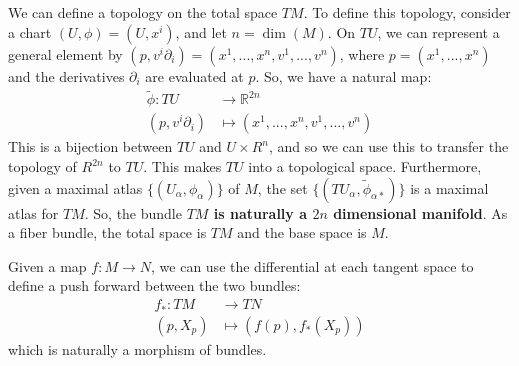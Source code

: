 \documentclass[11pt, oneside]{article}   	%
\theoremstyle{definition}
\begin{document}
We can define a topology on the total space $TM$. To define this topology, consider a chart $(U, \phi) = (U, x^i)$, and let $n = 
\dim(M)$. On $TU$, we can represent a general element by $(p, v^i\partial_i) = (x^1, ..., x^n, v^1, ..., v^n)$, where $p = 
(x^1, ..., x^n)$ and the derivatives $\partial_i$ are evaluated at $p$. So, we have a natural map:
\begin{align}
	\tilde \phi : TU &\rightarrow \mathbb R^{2n} \\
	(p, v^i\partial_i) &\mapsto (x^1, ..., x^n, v^1, ..., v^n)
\end{align}
This is a bijection between $TU$ and $U\times R^n$, and so we can use this to transfer the topology of $R^{2n}$ to $TU$. 
This makes $TU$ into a topological space. Furthermore, given a maximal atlas $\{(U_\alpha, \phi_\alpha)\}$ of $M$, the 
set $\{(TU_\alpha, \tilde \phi_{\alpha *})\}$ is a maximal atlas for $TM$. So, the bundle \textbf{$TM$ is naturally a $2n$ 
dimensional manifold}. As a fiber bundle, the total space is $TM$ and the base space is $M$. 

Given a map $f : M\rightarrow N$, we can use the differential at each tangent space to define a push forward between the two 
bundles:
\begin{align}
	f_* : TM &\rightarrow TN \\
		(p, X_p) &\mapsto (f(p), f_*(X_p))
\end{align}
which is naturally a morphism of bundles. 
\end{document}
